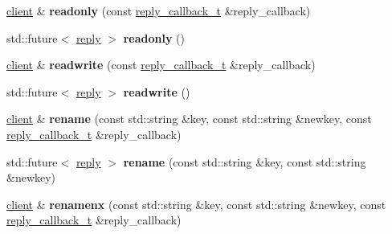 \begin{DoxyCompactItemize}
\hyperlink{classcpp__redis_1_1client}{client} \& {\bfseries readonly} (const \hyperlink{classcpp__redis_1_1client_a061a1140d36d2eaeda82b09a0bb3f9f2}{reply\+\_\+callback\+\_\+t} \&reply\+\_\+callback)
\item 
\mbox{\label{classcpp__redis_1_1client_acbf4ef53964a7e451793c17b9ac103ee}} 
std\+::future$<$ \hyperlink{classcpp__redis_1_1reply}{reply} $>$ {\bfseries readonly} ()
\item 
\mbox{\label{classcpp__redis_1_1client_a0a9bfe5e6ec4ccbaf2b633dedc55a581}} 
\hyperlink{classcpp__redis_1_1client}{client} \& {\bfseries readwrite} (const \hyperlink{classcpp__redis_1_1client_a061a1140d36d2eaeda82b09a0bb3f9f2}{reply\+\_\+callback\+\_\+t} \&reply\+\_\+callback)
\item 
\mbox{\label{classcpp__redis_1_1client_afc139fc098703cf5ec661fedc0552184}} 
std\+::future$<$ \hyperlink{classcpp__redis_1_1reply}{reply} $>$ {\bfseries readwrite} ()
\item 
\mbox{\label{classcpp__redis_1_1client_abbc2bb4b988d5e3e539d65d3eb9f511f}} 
\hyperlink{classcpp__redis_1_1client}{client} \& {\bfseries rename} (const std\+::string \&key, const std\+::string \&newkey, const \hyperlink{classcpp__redis_1_1client_a061a1140d36d2eaeda82b09a0bb3f9f2}{reply\+\_\+callback\+\_\+t} \&reply\+\_\+callback)
\item 
\mbox{\label{classcpp__redis_1_1client_a6a4ab4ac68aa92560569db6683bb591c}} 
std\+::future$<$ \hyperlink{classcpp__redis_1_1reply}{reply} $>$ {\bfseries rename} (const std\+::string \&key, const std\+::string \&newkey)
\item 
\mbox{\label{classcpp__redis_1_1client_a80b0abd5548ae3bfe22ed008767689c0}} 
\hyperlink{classcpp__redis_1_1client}{client} \& {\bfseries renamenx} (const std\+::string \&key, const std\+::string \&newkey, const \hyperlink{classcpp__redis_1_1client_a061a1140d36d2eaeda82b09a0bb3f9f2}{reply\+\_\+callback\+\_\+t} \&reply\+\_\+callback)
\item 
\mbox{\label{classcpp__redis_1_1client_a1b5110b73c9561e5b235317fa03ee4bb}} 

\end{DoxyCompactItemize}
